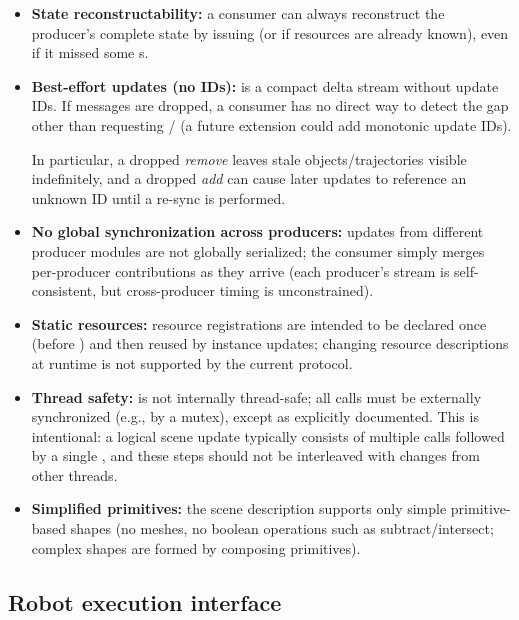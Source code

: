 \begin{itemize}
    \item \textbf{State reconstructability:} a consumer can always reconstruct the producer's complete state by issuing  (or  if resources are already known), even if it missed some s.
    \item \textbf{Best-effort updates (no IDs):}  is a compact delta stream without update IDs. If messages are dropped, a consumer has no direct way to detect the gap other than requesting / (a future extension could add monotonic update IDs).
    
    In particular, a dropped \emph{remove} leaves stale objects/trajectories visible indefinitely, and a dropped \emph{add} can cause later updates to reference an unknown ID until a re-sync is performed.
    \item \textbf{No global synchronization across producers:} updates from different producer modules are not globally serialized; the consumer simply merges per-producer contributions as they arrive (each producer's stream is self-consistent, but cross-producer timing is unconstrained).
    \item \textbf{Static resources:} resource registrations are intended to be declared once (before ) and then reused by instance updates; changing resource descriptions at runtime is not supported by the current protocol.
    \item \textbf{Thread safety:}  is not internally thread-safe; all calls must be externally synchronized (e.g., by a mutex), except  as explicitly documented. This is intentional: a logical scene update typically consists of multiple  calls followed by a single , and these steps should not be interleaved with changes from other threads.
    \item \textbf{Simplified primitives:} the scene description supports only simple primitive-based shapes (no meshes, no boolean operations such as subtract/intersect; complex shapes are formed by composing primitives).
\end{itemize}



\subsection{Robot execution interface} \label{sec:ch3_robot_interface}

